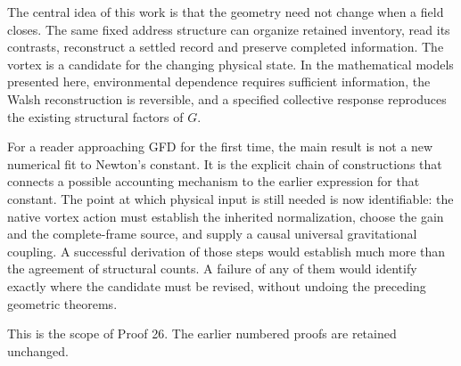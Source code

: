 \documentclass[
  11pt,
]{article}
\begin{document}
The central idea of this work is that the geometry need not change when
a field closes. The same fixed address structure can organize retained
inventory, read its contrasts, reconstruct a settled record and preserve
completed information. The vortex is a candidate for the changing
physical state. In the mathematical models presented here, environmental
dependence requires sufficient information, the Walsh reconstruction is
reversible, and a specified collective response reproduces the existing
structural factors of \(G\).

For a reader approaching GFD for the first time, the main result is not
a new numerical fit to Newton's constant. It is the explicit chain of
constructions that connects a possible accounting mechanism to the
earlier expression for that constant. The point at which physical input
is still needed is now identifiable: the native vortex action must
establish the inherited normalization, choose the gain and the
complete-frame source, and supply a causal universal gravitational
coupling. A successful derivation of those steps would establish much
more than the agreement of structural counts. A failure of any of them
would identify exactly where the candidate must be revised, without
undoing the preceding geometric theorems.

This is the scope of Proof 26. The earlier numbered proofs
are retained unchanged.
\end{document}
